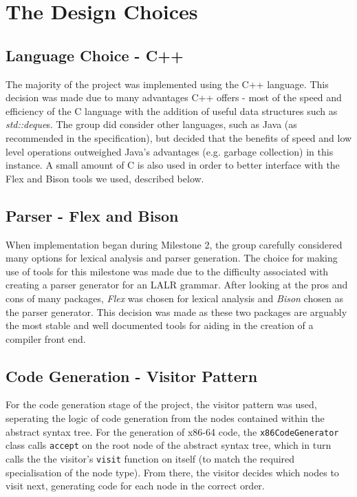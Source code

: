 \documentclass[a4wide, 11pt]{article}
\begin{document}
\section{The Design Choices}

\subsection{Language Choice - C++}
The majority of the project was implemented using the C++ language. This
decision was made due to many advantages C++ offers - most of the speed and
efficiency of the C language with the addition of useful data structures such
as \emph{std::deque}s. The group did consider other languages, such as Java (as
recommended in the specification), but decided that the benefits of speed and
low level operations outweighed Java's advantages (e.g. garbage collection) in
this instance. A small amount of C is also used in order to better interface
with the Flex and Bison tools we used, described below.

\subsection{Parser - Flex and Bison}

When implementation began during Milestone 2, the group carefully considered
many options for lexical analysis and parser generation. The choice for making 
use of tools for this milestone was made due to the difficulty associated with
creating a parser generator for an LALR grammar. After looking at the
pros and cons of many packages, \emph{Flex} was chosen for lexical analysis
and \emph{Bison} chosen as the parser generator. This decision was made as 
these two packages are arguably the most stable and well documented tools for 
aiding in the creation of a compiler front end.

\subsection{Code Generation - Visitor Pattern}

For the code generation stage of the project, the visitor pattern was used, 
seperating the logic of code generation from the nodes contained within the
abstract syntax tree. For the generation of x86-64 code, the \texttt{x86CodeGenerator}
class calls \texttt{accept} on the root node of the abstract syntax tree, which
in turn calls the the visitor's \texttt{visit} function on itself (to match
the required specialisation of the node type). From there, the visitor decides
which nodes to visit next, generating code for each node in the correct order. 
\end{document}

